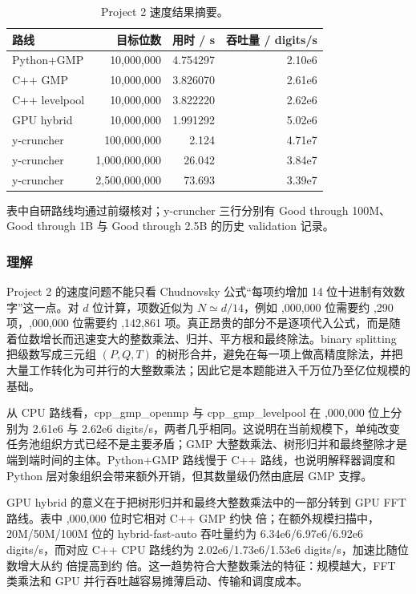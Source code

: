 \documentclass[12pt,a4paper,fontset=none]{ctexart}
\newcommand{\blocktitle}[1]{\subsubsection{#1}}
\newcommand{\codeinline}[1]{{\normalfont #1}}
\begin{document}
\begin{table}[H]
  \centering
  \caption{Project 2 速度结果摘要。}
  \begin{tabular}{lrrr}
    \toprule
    路线 & 目标位数 & 用时 / s & 吞吐量 / digits/s \\
    \midrule
    Python+GMP & 10,000,000 & 4.754297 & 2.10e6 \\
    C++ GMP & 10,000,000 & 3.826070 & 2.61e6 \\
    C++ levelpool & 10,000,000 & 3.822220 & 2.62e6 \\
    GPU hybrid & 10,000,000 & 1.991292 & 5.02e6 \\
    y-cruncher & 100,000,000 & 2.124 & 4.71e7 \\
    y-cruncher & 1,000,000,000 & 26.042 & 3.84e7 \\
    y-cruncher & 2,500,000,000 & 73.693 & 3.39e7 \\
    \bottomrule
  \end{tabular}
\end{table}
表中自研路线均通过前缀核对；y-cruncher 三行分别有 \codeinline{Good through 100M}、\codeinline{Good through 1B} 与 \codeinline{Good through 2.5B} 的历史 validation 记录。

\blocktitle{理解}
Project 2 的速度问题不能只看 Chudnovsky 公式“每项约增加 14 位十进制有效数字”这一点。对 \(d\) 位计算，项数近似为 \(N\simeq d/14\)，例如 \codeinline{10,000,000} 位需要约 \codeinline{714,290} 项，\codeinline{100,000,000} 位需要约 \codeinline{7,142,861} 项。真正昂贵的部分不是逐项代入公式，而是随着位数增长而迅速变大的整数乘法、归并、平方根和最终除法。binary splitting 把级数写成三元组 $(P,Q,T)$ 的树形合并，避免在每一项上做高精度除法，并把大量工作转化为可并行的大整数乘法；因此它是本题能进入千万位乃至亿位规模的基础。

从 CPU 路线看，\codeinline{cpp\_gmp\_openmp} 与 \codeinline{cpp\_gmp\_levelpool} 在 \codeinline{10,000,000} 位上分别为 \codeinline{2.61e6} 与 \codeinline{2.62e6 digits/s}，两者几乎相同。这说明在当前规模下，单纯改变任务池组织方式已经不是主要矛盾；GMP 大整数乘法、树形归并和最终整除才是端到端时间的主体。Python+GMP 路线慢于 C++ 路线，也说明解释器调度和 Python 层对象组织会带来额外开销，但其数量级仍然由底层 GMP 支撑。

GPU hybrid 的意义在于把树形归并和最终大整数乘法中的一部分转到 GPU FFT 路线。表中 \codeinline{10,000,000} 位时它相对 C++ GMP 约快 \codeinline{1.92} 倍；在额外规模扫描中，\codeinline{20M/50M/100M} 位的 \codeinline{hybrid-fast-auto} 吞吐量约为 \codeinline{6.34e6/6.97e6/6.92e6 digits/s}，而对应 C++ CPU 路线约为 \codeinline{2.02e6/1.73e6/1.53e6 digits/s}，加速比随位数增大从约 \codeinline{3.15} 倍提高到约 \codeinline{4.52} 倍。这一趋势符合大整数乘法的特征：规模越大，FFT 类乘法和 GPU 并行吞吐越容易摊薄启动、传输和调度成本。
\end{document}
